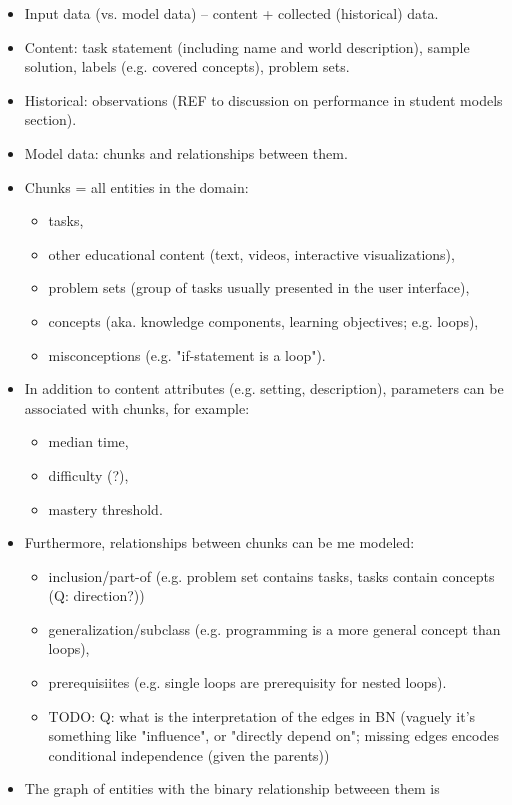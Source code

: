 \begin{itemize}
\item Input data (vs. model data) -- content + collected (historical) data.
\item Content:
  task statement (including name and world description),
  sample solution, labels (e.g. covered concepts), problem sets.
\item Historical: observations (REF to discussion on performance in student models section).
\item Model data: chunks and relationships between them.
\item Chunks = all entities in the domain:
\begin{itemize}
\item tasks,
\item other educational content (text, videos, interactive visualizations),
\item problem sets (group of tasks usually presented in the user interface),
\item concepts (aka. knowledge components, learning objectives; e.g. loops),
\item misconceptions (e.g. "if-statement is a loop").
\end{itemize}
\item In addition to content attributes (e.g. setting, description),
    parameters can be associated with chunks, for example:
\begin{itemize}
\item median time,
\item difficulty (?),
\item mastery threshold.
\end{itemize}
\item Furthermore, relationships between chunks can be me modeled:
\begin{itemize}
\item inclusion/part-of (e.g. problem set contains tasks, tasks contain
  concepts (Q: direction?))
\item generalization/subclass (e.g. programming is a more general concept than loops),
\item prerequisiites (e.g. single loops are prerequisity for nested loops).
\item TODO: Q: what is the interpretation of the edges in BN
  (vaguely it's something like "influence", or "directly depend on";
   missing edges encodes conditional independence (given the parents))
\end{itemize}
\item The graph of entities with the binary relationship betweeen them is

\end{itemize}
